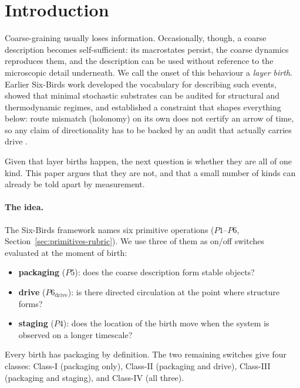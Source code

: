 \section{Introduction}
\label{sec:introduction}

Coarse-graining usually loses information. Occasionally, though, a coarse description becomes self-sufficient: its macrostates persist, the coarse dynamics reproduces them, and the description can be used without reference to the microscopic detail underneath. We call the onset of this behaviour a \emph{layer birth}. Earlier Six-Birds work developed the vocabulary for describing such events, showed that minimal stochastic substrates can be audited for structural and thermodynamic regimes, and established a constraint that shapes everything below: route mismatch (holonomy) on its own does not certify an arrow of time, so any claim of directionality has to be backed by an audit that actually carries drive \cite{sixbirds_foundations,sixbirds_create_stone,sixbirds_protocol_trap,liang_pigolotti_2023,seifert_2012}.

Given that layer births happen, the next question is whether they are all of one kind. This paper argues that they are not, and that a small number of kinds can already be told apart by measurement.

\paragraph{The idea.} The Six-Birds framework names six primitive operations ($P1$--$P6$, Section~\ref{sec:primitives-rubric}). We use three of them as on/off switches evaluated at the moment of birth:
\begin{itemize}
  \item \textbf{packaging} ($P5$): does the coarse description form stable objects?
  \item \textbf{drive} ($P6_{\mathrm{drive}}$): is there directed circulation at the point where structure forms?
  \item \textbf{staging} ($P4$): does the location of the birth move when the system is observed on a longer timescale?
\end{itemize}
Every birth has packaging by definition. The two remaining switches give four classes: Class-I (packaging only), Class-II (packaging and drive), Class-III (packaging and staging), and Class-IV (all three).

